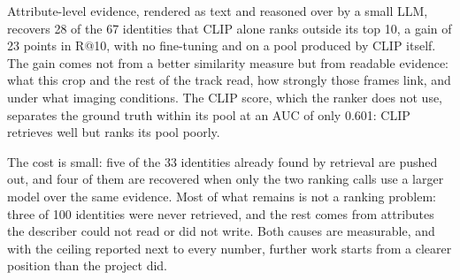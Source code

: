 Attribute-level evidence, rendered as text and reasoned over by a small LLM,
recovers 28 of the 67 identities that CLIP alone ranks outside its top 10, a gain
of 23 points in R@10, with no fine-tuning and on a pool produced by CLIP itself.
The gain comes not from a better similarity measure but from readable evidence:
what this crop and the rest of the track read, how strongly those frames link, and
under what imaging conditions. The CLIP score, which the ranker does not use,
separates the ground truth within its pool at an AUC of only 0.601: CLIP retrieves
well but ranks its pool poorly.

The cost is small: five of the 33 identities already found by retrieval are pushed
out, and four of them are recovered when only the two ranking calls use a larger
model over the same evidence. Most of what remains is not a ranking problem: three
of 100 identities were never retrieved, and the rest comes from attributes the
describer could not read or did not write. Both causes are measurable, and with the
ceiling reported next to every number, further work starts from a clearer position
than the project did.
